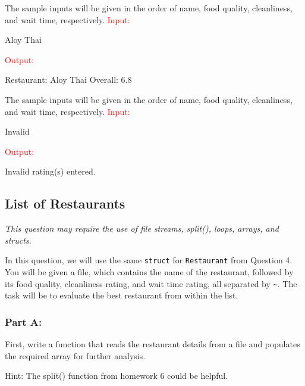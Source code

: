 \begin{sample}
The sample inputs will be given in the order of name, food quality, cleanliness, and wait time, respectively. \newline
\textcolor{red}{Input:} 

Aloy Thai   

\textcolor{red}{Output:}

Restaurant: Aloy Thai Overall: 6.8

\end{sample}

\begin{sample}
The sample inputs will be given in the order of name, food quality, cleanliness, and wait time, respectively. \newline
\textcolor{red}{Input:} 

Invalid   

\textcolor{red}{Output:}

Invalid rating(s) entered.

\end{sample}

\subsection{List of Restaurants} %
\textit{This question may require the use of file streams, split(), loops, arrays, and structs.} \newline

In this question, we will use the same \texttt{struct} for \texttt{Restaurant} from Question 4. You will be given a file, which contains the name of the restaurant, followed by its food quality, cleanliness rating, and wait time rating, all separated by \texttt{\textasciitilde}. The task will be to evaluate the best restaurant from within the list.

\subsubsection{Part A:}
First, write a function that reads the restaurant details from a file and populates the required array for further analysis. 

Hint: The split() function from homework 6 could be helpful. 

